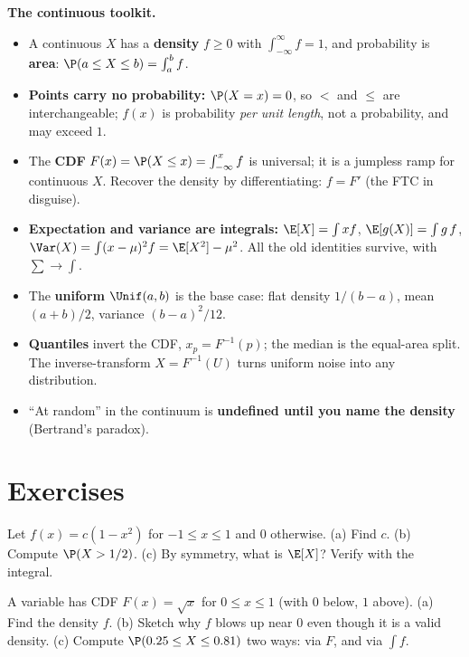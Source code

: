 \begin{focusbox}
\textbf{The continuous toolkit.}
\begin{itemize}
\item A continuous $X$ has a \textbf{density} $f \ge 0$ with $\int_{-\infty}^\infty
      f = 1$, and probability is \textbf{area}: $\P(a\le X\le b)=\int_a^b f$.
\item \textbf{Points carry no probability:} $\P(X=x)=0$, so $<$ and $\le$ are
      interchangeable; $f(x)$ is probability \emph{per unit length}, not a
      probability, and may exceed $1$.
\item The \textbf{CDF} $F(x)=\P(X\le x)=\int_{-\infty}^x f$ is universal; it is a
      jumpless ramp for continuous $X$. Recover the density by differentiating:
      $f = F'$ (the FTC in disguise).
\item \textbf{Expectation and variance are integrals:} $\E[X]=\int x f$,
      $\E[g(X)]=\int g\,f$, $\Var(X)=\int(x-\mu)^2 f = \E[X^2]-\mu^2$. All the old
      identities survive, with $\sum \to \int$.
\item The \textbf{uniform} $\Unif(a,b)$ is the base case: flat density
      $1/(b-a)$, mean $(a+b)/2$, variance $(b-a)^2/12$.
\item \textbf{Quantiles} invert the CDF, $x_p=F^{-1}(p)$; the median is the
      equal-area split. The inverse-transform $X=F^{-1}(U)$ turns uniform noise into
      any distribution.
\item ``At random'' in the continuum is \textbf{undefined until you name the
      density} (Bertrand's paradox).
\end{itemize}
\end{focusbox}

\section{Exercises}
\label{ch10:exercises}

\begin{exercise}
\label{ch10:exr-norm}
Let $f(x) = c(1-x^2)$ for $-1 \le x \le 1$ and $0$ otherwise.
(a) Find $c$. (b) Compute $\P(X > 1/2)$. (c) By symmetry, what is $\E[X]$? Verify
with the integral.
\end{exercise}

\begin{exercise}
\label{ch10:exr-cdf}
A variable has CDF $F(x) = \sqrt{x}$ for $0 \le x \le 1$ (with $0$ below, $1$ above).
(a) Find the density $f$. (b) Sketch why $f$ blows up near $0$ even though it is a
valid density. (c) Compute $\P(0.25 \le X \le 0.81)$ two ways: via $F$, and via
$\int f$.
\end{exercise}

